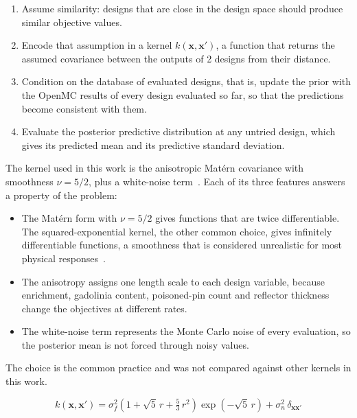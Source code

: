 \begin{enumerate}
  \item Assume similarity: designs that are close in the design space
        should produce similar objective values.

  \item Encode that assumption in a kernel $k(\mathbf{x},\mathbf{x}')$,
        a function that returns the assumed covariance between the
        outputs of 2 designs from their distance.

  \item Condition on the database of evaluated designs, that is, update
        the prior with the OpenMC results of every design evaluated so
        far, so that the predictions become consistent with them.

  \item Evaluate the posterior predictive distribution at any untried
        design, which gives its predicted mean and its predictive
        standard deviation.
\end{enumerate}

The kernel used in this work is the anisotropic Mat\'ern covariance
with smoothness $\nu = 5/2$, plus a white-noise
term~\cite{rasmussen_gp_2006}. Each of its three features answers a
property of the problem:

\begin{itemize}
  \item The Mat\'ern form with $\nu = 5/2$ gives functions that are twice
        differentiable. The squared-exponential kernel, the other common
        choice, gives infinitely differentiable functions, a smoothness
        that is considered unrealistic for most physical
        responses~\cite{rasmussen_gp_2006}.

  \item The anisotropy assigns one length scale to each design variable,
        because enrichment, gadolinia content, poisoned-pin count and
        reflector thickness change the objectives at different rates.

  \item The white-noise term represents the Monte Carlo noise of every
        evaluation, so the posterior mean is not forced through noisy
        values.
\end{itemize}

The choice is the common practice and was not compared against other
kernels in this work.

\begin{equation}
k(\mathbf{x}, \mathbf{x}')
= \sigma_f^{2}
\left( 1 + \sqrt{5}\,r + \tfrac{5}{3}\,r^{2} \right)
\exp\!\left( -\sqrt{5}\,r \right)
+ \sigma_n^{2}\,\delta_{\mathbf{x}\mathbf{x}'}
\label{eq:kernel}
\end{equation}

